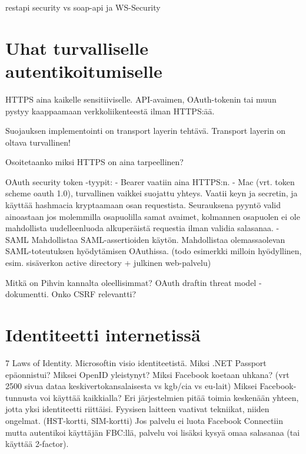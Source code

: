 \documentclass[english,gradu]{tktltiki}
\begin{document}
  restapi security vs soap-api ja WS-Security





\section{Uhat turvalliselle autentikoitumiselle} %
\label{sec:uhat_turvalliselle_autentikoitumiselle}
  HTTPS aina kaikelle sensitiiviselle. API-avaimen, OAuth-tokenin tai muun pystyy kaappaamaan verkkoliikenteestä ilman HTTPS:ää.

  Suojauksen implementointi on transport layerin tehtävä. Transport layerin on oltava turvallinen!

  Osoitetaanko miksi HTTPS on aina tarpeellinen?

  OAuth security token -tyypit:
  - Bearer vaatiin aina HTTPS:n.
  - Mac (vrt. token scheme oauth 1.0), turvallinen vaikkei suojattu yhteys. Vaatii keyn ja secretin, ja käyttää hashmacia kryptaamaan osan requestista. Seurauksena pyyntö valid ainoastaan jos molemmilla osapuolilla samat avaimet, kolmannen osapuolen ei ole mahdollista uudelleenluoda alkuperäistä requestia ilman validia salasanaa.
  - SAML Mahdollistaa SAML-assertioiden käytön. Mahdollistaa olemassaolevan SAML-toteutuksen hyödytämisen OAuthissa. (todo esimerkki milloin hyödyllinen, esim. sisäverkon active directory + julkinen web-palvelu)

  Mitkä on Pihvin kannalta oleellisimmat?
  OAuth draftin threat model -dokumentti.
  Onko CSRF relevantti?

\section{Identiteetti internetissä} %
\label{sec:identiteetti_internetissä}
  7 Laws of Identity.
  Microsoftin visio identiteetistä. Miksi .NET Passport epäonnistui?
  Miksei OpenID yleistynyt?
  Miksi Facebook koetaan uhkana? (vrt 2500 sivua dataa keskivertokansalaisesta vs kgb/cia vs eu-lait)
  Miksei Facebook-tunnusta voi käyttää kaikkialla?
  Eri järjestelmien pitää toimia keskenään yhteen, jotta yksi identiteetti riittäisi.
  Fyysisen laitteen vaativat tekniikat, niiden ongelmat. (HST-kortti, SIM-kortti)
  Jos palvelu ei luota Facebook Connectiin mutta autentikoi käyttäjän FBC:llä, palvelu voi lisäksi kysyä omaa salasanaa (tai käyttää 2-factor).
\end{document}
